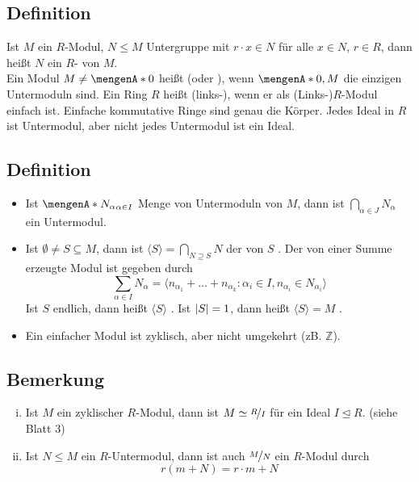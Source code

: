\subsection[Definition: Untermodul, einfache Moduln und Ringe]{Definition} %
\label{sub:24}
Ist $M$ ein $R$-Modul, $N \le M$ Untergruppe mit $r \cdot x \in N$ für alle $x \in N$, $r \in R$, dann heißt $N$ ein $R$- von $M$.
 \smallskip \\
Ein Modul $M \not= \set{0}$ heißt  (oder ), wenn $\set{0},M$ die einzigen Untermoduln sind. 
Ein Ring $R$ heißt (links-), wenn er als (Links-)$R$-Modul einfach ist.  
Einfache kommutative Ringe sind genau die Körper. Jedes Ideal in $R$ ist Untermodul, aber nicht jedes Untermodul ist ein Ideal.

\subsection[Definition: erzeugte Untermoduln]{Definition} %
\label{sub:25}
\begin{itemize}
	\item Ist $\set{N_\alpha}_{\alpha \in I} $ Menge von Untermoduln von $M$, dann ist $\bigcap_{\alpha \in J} N_\alpha$ ein Untermodul.
	\item Ist $\emptyset \not= S \subseteq M$, dann ist $\langle S \rangle = \bigcap_{N \supseteq S} N$ der von $S$ . Der von einer Summe 
	erzeugte Modul ist gegeben durch
	\[
		\sum_{\alpha \in I} N_\alpha = \langle n_{\alpha_1} + \ldots + n_{\alpha_k} : \alpha_i \in I, n_{\alpha_i} \in N_{\alpha_i}\rangle
	\] 
	Ist $S$ endlich, dann heißt $\langle S \rangle$ . Ist $\abs*{S}=1 $, dann heißt $\langle S \rangle = M$ .
	\item Ein einfacher Modul ist zyklisch, aber nicht umgekehrt (zB. $\mathds{Z}$).   
\end{itemize}

\subsection[Bemerkung zu Modulstrukturen auf Quotienten]{Bemerkung} %
\label{sub:26}
\begin{enumerate}[(i)]
	\item Ist $M$ ein zyklischer $R$-Modul, dann ist $M \simeq \nicefrac{R}{I}$ für ein Ideal $I \unlhd R$. \hfill(siehe Blatt 3)
	\item Ist $N \le M$ ein $R$-Untermodul, dann ist auch $\nicefrac{M}{N}$ ein $R$-Modul durch 
	\[
		r(m + N) = r \cdot m + N
	\]
\end{enumerate}

